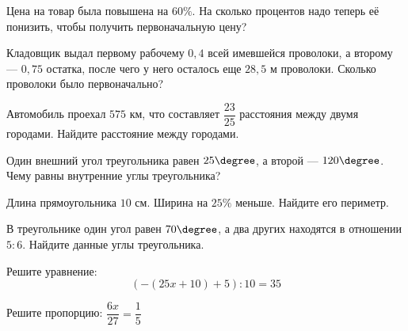 \begin{exam}
	\begin{listofex}
		\item Цена на товар была повышена на \( 60\% \). На сколько процентов надо теперь её понизить, чтобы получить первоначальную цену?
		\item Кладовщик выдал первому рабочему \(0,4\) всей имевшейся проволоки, а второму --- \(0,75\) остатка, после чего у него осталось еще \(28,5\) м проволоки. Сколько проволоки было первоначально?
		\item Автомобиль проехал \(575\) км, что составляет \(\dfrac{23}{25}\) расстояния между двумя городами. Найдите расстояние между городами.
		\item Один внешний угол треугольника равен \( 25\degree \), а второй --- \( 120\degree \). Чему равны внутренние углы треугольника?
		\item Длина прямоугольника \(10\) см. Ширина на \(25\%\) меньше. Найдите его периметр.
		\item В треугольнике один угол равен \(70 \degree\), а два других находятся в отношении \(5:6\). Найдите данные углы треугольника.
		\item Решите уравнение: \[ (-(25x+10)+5):10=35\]
		\item Решите пропорцию: \( \dfrac{6x}{27}=\dfrac{1}{5} \)
		
	\end{listofex}
\end{exam}
